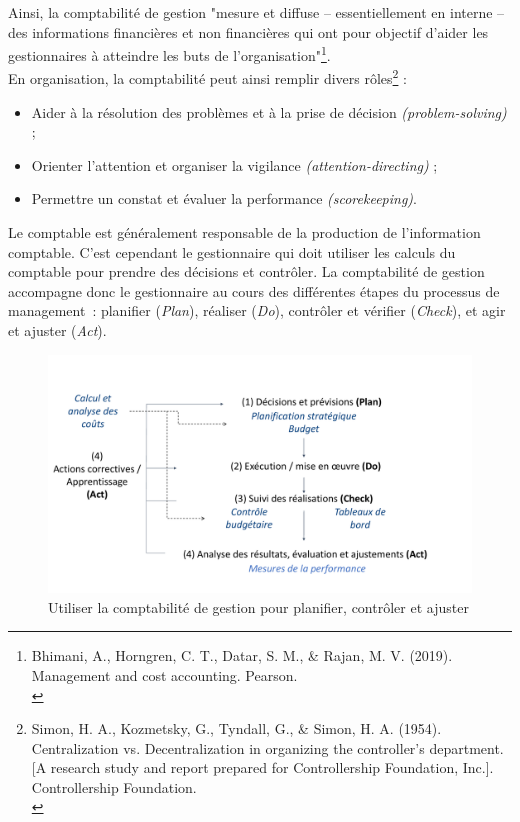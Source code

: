 \documentclass{tufte-handout}
\begin{document}
Ainsi, la comptabilité de gestion "mesure et diffuse – essentiellement en interne – des informations financières et non financières qui ont pour objectif d'aider les gestionnaires à atteindre les buts de l’organisation"\footnote{Bhimani, A., Horngren, C. T., Datar, S. M., \& Rajan, M. V. (2019). Management and cost accounting. Pearson.\\}.\\

En organisation, la comptabilité peut ainsi remplir divers rôles\footnote{Simon, H. A., Kozmetsky, G., Tyndall, G., \& Simon, H. A. (1954). Centralization vs. Decentralization in organizing the controller’s department. [A research study and report prepared for Controllership Foundation, Inc.]. Controllership Foundation.\\} :\\
\begin{itemize}
\item Aider à la résolution des problèmes et à la prise de décision \emph{(problem-solving)} ;\\
\item Orienter l’attention et organiser la vigilance \emph{(attention-directing)} ;\\
\item Permettre un constat et évaluer la performance \emph{(scorekeeping)}.\\
\end{itemize}

Le comptable est généralement responsable de la production de l'information comptable. C'est cependant le gestionnaire qui doit utiliser les calculs du comptable pour prendre des décisions et contrôler. La comptabilité de gestion accompagne donc le gestionnaire au cours des différentes étapes du processus de management : planifier (\emph{Plan}), réaliser (\emph{Do}), contrôler et vérifier (\emph{Check}), et agir et ajuster (\emph{Act}).\\

\begin{figure}[htbp]
\centering
\includegraphics[width=.9\linewidth]{./img/pdca.pdf}
\caption{\label{fig:org77839de}Utiliser la comptabilité de gestion pour planifier, contrôler et ajuster}
\end{figure}
\end{document}
